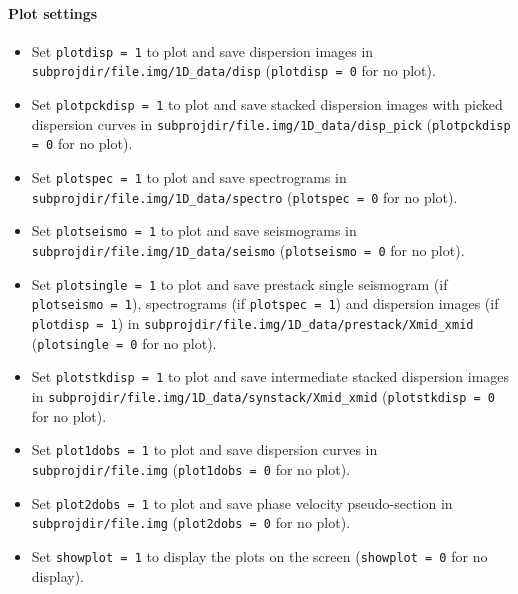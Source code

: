 \documentclass[twoside,a4paper]{article}
\begin{document}
\paragraph{Plot settings}
\begin{itemize}[leftmargin=*]
\setlength\itemsep{2ex}
\item Set \verb|plotdisp = 1| to plot and save dispersion images in \verb|subprojdir/file.img/1D_data/disp| (\verb|plotdisp = 0| for no plot).

\item Set \verb|plotpckdisp = 1| to plot and save stacked dispersion images with picked dispersion curves in \verb|subprojdir/file.img/1D_data/disp_pick| (\verb|plotpckdisp = 0| for no plot).

\item Set \verb|plotspec = 1| to plot and save spectrograms in \verb|subprojdir/file.img/1D_data/spectro| (\verb|plotspec = 0| for no plot).

\item Set \verb|plotseismo = 1| to plot and save seismograms in \verb|subprojdir/file.img/1D_data/seismo| (\verb|plotseismo = 0| for no plot).

\item Set \verb|plotsingle = 1| to plot and save prestack single seismogram (if \verb|plotseismo = 1|), spectrograms (if \verb|plotspec = 1|) and dispersion images (if \verb|plotdisp = 1|) in \verb|subprojdir/file.img/1D_data/prestack/Xmid_xmid| (\verb|plotsingle = 0| for no plot).

\item Set \verb|plotstkdisp = 1| to plot and save intermediate stacked dispersion images in \verb|subprojdir/file.img/1D_data/synstack/Xmid_xmid| (\verb|plotstkdisp = 0| for no plot).

\item Set \verb|plot1dobs = 1| to plot and save dispersion curves in \verb|subprojdir/file.img| (\verb|plot1dobs = 0| for no plot).

\item Set \verb|plot2dobs = 1| to plot and save phase velocity pseudo-section in \verb|subprojdir/file.img| (\verb|plot2dobs = 0| for no plot).

\item Set \verb|showplot = 1| to display the plots on the screen (\verb|showplot = 0| for no display).
\end{itemize}
\end{document}
